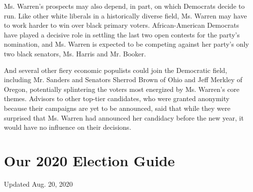 Ms. Warren's prospects may also depend, in part, on which Democrats
decide to run. Like other white liberals in a historically diverse
field, Ms. Warren may have to work harder to win over black primary
voters. African-American Democrats have played a decisive role in
settling the last two open contests for the party's nomination, and Ms.
Warren is expected to be competing against her party's only two black
senators, Ms. Harris and Mr. Booker.

And several other fiery economic populists could join the Democratic
field, including Mr. Sanders and Senators Sherrod Brown of Ohio and Jeff
Merkley of Oregon, potentially splintering the voters most energized by
Ms. Warren's core themes. Advisors to other top-tier candidates, who
were granted anonymity because their campaigns are yet to be announced,
said that while they were surprised that Ms. Warren had announced her
candidacy before the new year, it would have no influence on their
decisions.

\hypertarget{our-2020-election-guide}{%
\section{Our 2020 Election Guide}\label{our-2020-election-guide}}

Updated Aug. 20, 2020

